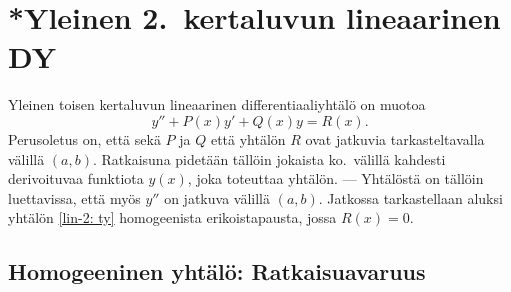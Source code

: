 \section{*Yleinen 2.\ kertaluvun lineaarinen DY} \label{2. kertaluvun lineaarinen DY}
\alku
{}

Yleinen toisen kertaluvun lineaarinen differentiaaliyhtälö on muotoa
\begin{equation} \label{lin-2: ty}
y''+P(x)y'+Q(x)y=R(x).
\end{equation}
Perusoletus on, että sekä
 $P$ ja $Q$ että yhtälön  $R$ 
ovat jatkuvia tarkasteltavalla välillä $(a,b)$. Ratkaisuna pidetään tällöin jokaista ko.\
välillä kahdesti derivoituvaa funktiota $y(x)$, joka toteuttaa yhtälön. --- Yhtälöstä on
tällöin luettavissa, että myös $y''$ on jatkuva välillä $(a,b)$. Jatkossa tarkastellaan aluksi
yhtälön \eqref{lin-2: ty} homogeenista erikoistapausta, jossa $R(x)=0$.

\subsection*{Homogeeninen yhtälö: Ratkaisuavaruus}

